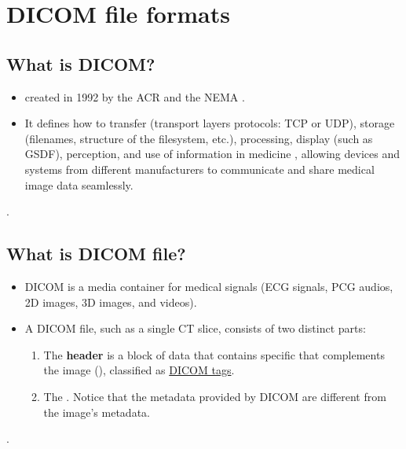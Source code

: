 \chapter{\gls{DICOM} file formats}

\section{What is DICOM?}
\begin{itemize}
\item {}
   created in 1992 by
  the \gls{ACR} and the \gls{NEMA} \cite{DICOM2025}.
\item It defines how to transfer (transport layers protocols:
  \gls{TCP} or \gls{UDP}), storage (filenames, structure of the
  filesystem, etc.), processing, display (such as \gls{GSDF}),
  perception, and use of information in medicine
  \cite{bushberg2011essential}, allowing devices and systems from
  different manufacturers to communicate and share medical image data
  seamlessly.
\end{itemize}.

\section{What is DICOM file?}
\begin{itemize}
\item \gls{DICOM} is a media container for medical signals
  (\gls{ECG} signals, \gls{PCG} audios, 2D images, 3D images, and videos).
\item A DICOM file, such as a single CT slice, consists of two
  distinct parts:
  \begin{enumerate}
  \item The \textbf{header} is a block of data that contains specific
      that complements the image
    (), classified as
    \href{https://dicom.nema.org/medical/dicom/current/output/html/part06.html#PS3.6}{DICOM
      tags}.
  \item The . Notice that the metadata provided by \gls{DICOM} are
    different from the image's metadata.
  \end{enumerate}
\end{itemize}.

